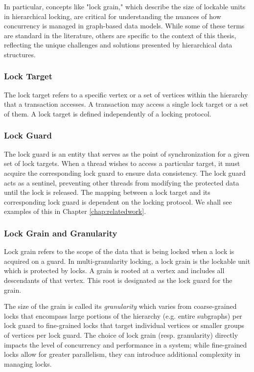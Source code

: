 In particular, concepts like "lock grain," which describe the size of lockable units in hierarchical locking, are critical for understanding the nuances of how concurrency is managed in graph-based data models. While some of these terms are standard in the literature, others are specific to the context of this thesis, reflecting the unique challenges and solutions presented by hierarchical data structures.


\subsubsection{Lock Target} The lock target refers to a specific vertex or a set of vertices within the hierarchy that a transaction accesses. A transaction may access a single lock target or a set of them. A lock target is defined independently of a locking protocol.  

\subsubsection{Lock Guard} The lock guard is an entity that serves as the point of synchronization for a given set of lock targets. When a thread wishes to access a particular target, it must acquire the corresponding lock guard to ensure data consistency. The lock guard acts as a sentinel, preventing other threads from modifying the protected data until the lock is released. The mapping between a lock target and its corresponding lock guard is dependent on the locking protocol. We shall see examples of this in Chapter \ref{chap:relatedwork}.

\subsubsection{Lock Grain and Granularity} Lock grain refers to the scope of the data that is being locked when a lock is acquired on a guard. In multi-granularity locking, a lock grain is the lockable unit which is protected by locks. A grain is rooted at a vertex and includes all descendants of that vertex. This root is designated as the lock guard for the grain.

The size of the grain is called its \emph{granularity} which varies from coarse-grained locks that encompass large portions of the hierarchy (e.g. entire subgraphs) per lock guard to fine-grained locks that target individual vertices or smaller groups of vertices per lock guard. The choice of lock grain (resp. granularity) directly impacts the level of concurrency and performance in a system; while fine-grained locks allow for greater parallelism, they can introduce additional complexity in managing locks.

